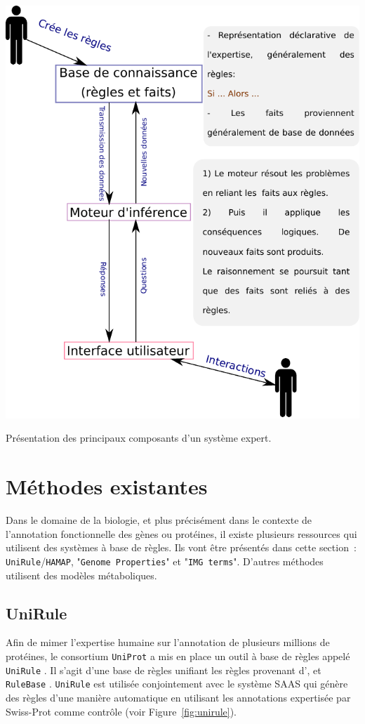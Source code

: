 \begin{refsegment}
    \begin{shadedfigure}[H]
        \centering
        \includegraphics[width=\textwidth]{img/systeme_expert.pdf}
        \caption{Présentation des principaux composants d'un système expert.}
        \label{fig:systeme_expert}
    \end{shadedfigure}
    
    \section{Méthodes existantes}
    
    Dans le domaine de la biologie, et plus précisément dans le contexte de l’annotation fonctionnelle des gènes ou protéines, il existe plusieurs ressources qui utilisent des systèmes à base de règles. Ils vont être présentés dans cette section : \texttt{UniRule}/\texttt{HAMAP}, "\texttt{Genome Properties}" et "\texttt{IMG terms}". D’autres méthodes utilisent des modèles métaboliques.
    
    \subsection{UniRule}
    Afin de mimer l'expertise humaine sur l'annotation de plusieurs millions de protéines, le consortium \texttt{UniProt} a mis en place un outil à base de règles appelé \texttt{UniRule} \cite{unirule2015,bridge2010unirule}. Il s'agit d'une base de règles unifiant les règles provenant d'\texttt{}, \texttt{} et \texttt{RuleBase} . \texttt{UniRule} est utilisée conjointement avec le système \acrfull{SAAS} \cite{kretschmann2001automatic,uniprot2015}  qui génère des règles d’une manière automatique en utilisant les annotations expertisée par Swiss-Prot comme contrôle (voir Figure~\cref{fig:unirule}).
    

\end{refsegment}
